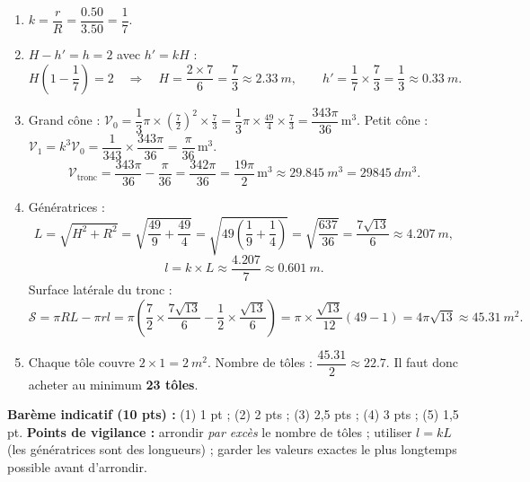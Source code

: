 \documentclass[11pt]{article}
\begin{document}
\begin{corrige}
\begin{enumerate}
    \item $k = \dfrac{r}{R} = \dfrac{\num{0,50}}{\num{3,50}} = \dfrac{1}{7}$.
    \item $H - h' = h = 2$ avec $h' = kH$ :
    \[
    H\left(1 - \frac{1}{7}\right) = 2 \quad \Rightarrow \quad H = \frac{2 \times 7}{6} = \frac{7}{3} \approx \SI{2,33}{m}, \qquad h' = \frac{1}{7} \times \frac{7}{3} = \frac{1}{3} \approx \SI{0,33}{m}.
    \]
    \item Grand cône : $\mathcal{V}_0 = \dfrac{1}{3}\pi \times \left(\frac{7}{2}\right)^2 \times \frac{7}{3} = \dfrac{1}{3}\pi \times \frac{49}{4} \times \frac{7}{3} = \dfrac{343\pi}{36}\,\text{m}^3$.
    Petit cône : $\mathcal{V}_1 = k^3 \mathcal{V}_0 = \dfrac{1}{343} \times \dfrac{343\pi}{36} = \dfrac{\pi}{36}\,\text{m}^3$.
    \[
    \mathcal{V}_{\text{tronc}} = \frac{343\pi}{36} - \frac{\pi}{36} = \frac{342\pi}{36} = \frac{19\pi}{2}\,\text{m}^3 \approx \SI{29,845}{m^3} = \SI{29845}{dm^3}.
    \]
    \item Génératrices :
    \[
    L = \sqrt{H^2 + R^2} = \sqrt{\frac{49}{9} + \frac{49}{4}} = \sqrt{49\left(\frac{1}{9}+\frac{1}{4}\right)} = \sqrt{\frac{637}{36}} = \frac{7\sqrt{13}}{6} \approx \SI{4,207}{m},
    \]
    \[
    l = k \times L \approx \frac{\num{4,207}}{7} \approx \SI{0,601}{m}.
    \]
    Surface latérale du tronc :
    \[
    \mathcal{S} = \pi R L - \pi r l = \pi\left(\frac{7}{2} \times \frac{7\sqrt{13}}{6} - \frac{1}{2} \times \frac{\sqrt{13}}{6}\right) = \pi \times \frac{\sqrt{13}}{12}(49 - 1) = 4\pi\sqrt{13} \approx \SI{45,31}{m^2}.
    \]
    \item Chaque tôle couvre $2 \times 1 = \SI{2}{m^2}$. Nombre de tôles : $\dfrac{\num{45,31}}{2} \approx \num{22,7}$. Il faut donc acheter au minimum \textbf{23 tôles}.
\end{enumerate}
\textbf{Barème indicatif (10 pts) :} (1) 1 pt ; (2) 2 pts ; (3) 2,5 pts ; (4) 3 pts ; (5) 1,5 pt.
\textbf{Points de vigilance :} arrondir \emph{par excès} le nombre de tôles ; utiliser $l = kL$ (les génératrices sont des longueurs) ; garder les valeurs exactes le plus longtemps possible avant d'arrondir.
\end{corrige}
\end{document}
